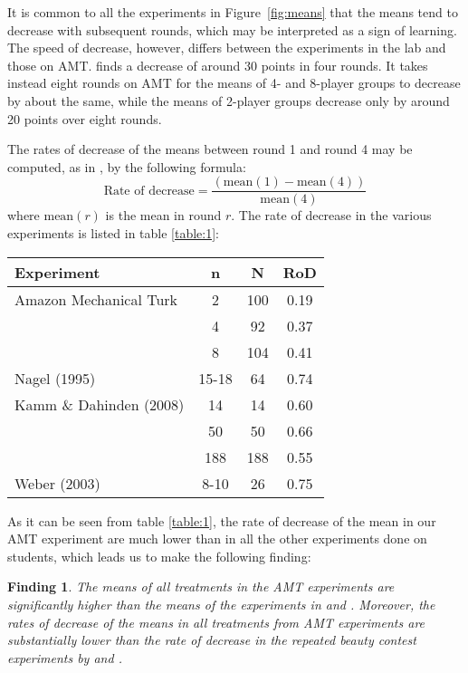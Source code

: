 \documentclass[12pt,review]{elsarticle}
\newtheorem{fdn}{Finding}
\begin{document}
It is common to all the experiments in Figure~\ref{fig:means} that the means tend to decrease with subsequent rounds, which may be interpreted as a sign of learning. The speed of decrease, however, differs between
the experiments in the lab and those on AMT. \citet{Nagel95} finds a decrease of around 30 points in four rounds. It takes instead eight rounds on AMT for the means of 4- and 8-player groups to decrease by about the same, while the means of 2-player groups decrease only by around 20 points over eight rounds.

The rates of decrease of the means between round 1 and round 4 may be computed, as in \citet{Nagel95}, by the following formula:
\[
\text{Rate of decrease}=\frac{(\text{mean}(1)-\text{mean}(4))}{\text{mean}(4)}
\]
where $\text{mean}(r)$ is the mean in round $r$. The rate of decrease in the various experiments is listed in table \ref{table:1}:

\begin{SCtable}
\begin{tabular}{lccc}
\hline
Experiment   &  n 		&  N 	&  RoD \\
\hline
Amazon Mechanical Turk   & 2 		& 100 	& 0.19 \\
	   & 4 		& 92 	& 0.37 \\
	   & 8 		& 104 	& 0.41 \\
Nagel (1995)    & 15-18 	& 64  	& 0.74  \\
Kamm \& Dahinden (2008)  & 14 		& 14 	& 0.60  \\
	   & 50 		& 50 	& 0.66  \\
	   & 188 		& 188 	& 0.55  \\
Weber (2003)   & 8-10	& 26	& 0.75  \\
\hline
\end{tabular}
\caption{Rates of decrease in iterated p-beauty contest experiments with $p=2/3$. n = group size; N = number of subjects; RoD = rate of decrease from round 1 to round 4.}
\label{table:1}
\end{SCtable}

As it can be seen from table \ref{table:1}, the rate of decrease of the mean in our AMT experiment are much lower than in all the other experiments done on students, which leads us to make the following finding:


\begin{fdn}
The means of all treatments in the AMT experiments are significantly higher than the means of the experiments in \citet{Nagel95, Kamm2008unter} and \citet{weber2003learning}. Moreover, the rates of decrease of the means in all treatments from AMT experiments are substantially lower than the rate of decrease in the repeated beauty contest experiments by \citet{Nagel95, Kamm2008unter} and \citet{weber2003learning}.
\end{fdn}
\end{document}
